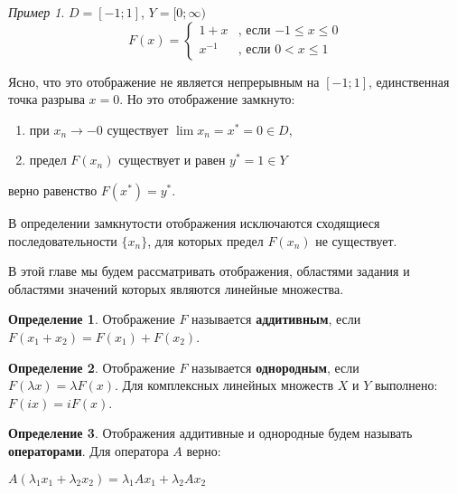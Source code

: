 \documentclass[12pt,a4paper,titlepage,oneside]{book}
\theoremstyle{definition}
\newtheorem*{definition}{Определение}
\theoremstyle{plain}
\theoremstyle{break}
\theoremstyle{remark}
\theoremstyle{remark}
\newtheorem*{example}{Пример}
\theoremstyle{remark}
\theoremstyle{remark}
\theoremstyle{plain}
\theoremstyle{plain}
\begin{document}
\begin{example}
$D=[-1;1]$, $Y=[0;\infty)$
\begin{equation*}
F(x) = 
\begin{cases}
   1+x &\text{, если $-1\leqslant x \leqslant 0$}\\
   x^{-1} &\text{, если $0< x \leqslant 1$}
\end{cases}
\end{equation*}

Ясно, что это отображение не является непрерывным на $[-1;1]$, единственная точка разрыва $x=0$. Но это отображение замкнуто:

\begin{enumerate}

 \item при $x_n \to -0$ существует $\lim x_n= x^*=0 \in D$,
 
 \item предел $F(x_n)$ существует и равен $y^*=1 \in Y$
 
\end{enumerate}
верно равенство $F(x^*)=y^*$.

\end{example}

В определении замкнутости отображения исключаются сходящиеся последовательности $\lbrace x_n \rbrace$, для которых предел $F(x_n)$ не существует.

В этой главе мы будем рассматривать отображения, областями задания и областями значений которых являются линейные множества.

\begin{definition} Отображение $F$ называется \textbf{аддитивным}, если $F(x_1+x_2)=F(x_1)+F(x_2)$.
\end{definition}

\begin{definition} Отображение $F$ называется \textbf{однородным}, если $F(\lambda x)=\lambda F(x)$. Для комплексных линейных множеств $X$ и $Y$ выполнено: $F(ix)=iF(x)$.
\end{definition}

\begin{definition} Отображения аддитивные и однородные будем называть \textbf{операторами}. Для оператора $A$ верно:

\begin{center}
	$A(\lambda_1x_1+\lambda_2x_2)=\lambda_1Ax_1+\lambda_2Ax_2$
\end{center}

\end{definition}
\end{document}
